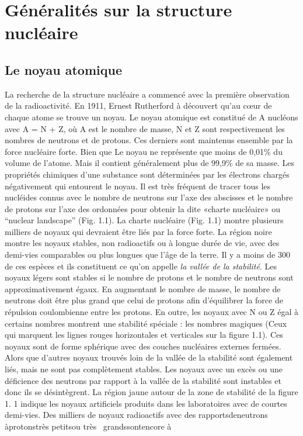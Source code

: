 \chapter{Généralités sur la structure nucléaire}

\section{Le noyau atomique}

 La recherche de la structure nucléaire a commencé avec la première observation de la radioactivité. En
1911, Ernest Rutherford à découvert qu'au cœur de chaque atome se trouve un noyau.
 Le noyau atomique est constitué de A nucléons avec A = N + Z, où A est le nombre de masse, N et Z sont
respectivement les nombres de neutrons et de protons. Ces derniers sont maintenus ensemble par la force nucléaire
forte. Bien que Le noyau ne représente que moins de 0,01\% du volume de l'atome. Mais il contient généralement plus de
99,9\% de sa masse. Les propriétés chimiques d'une substance sont déterminées par les électrons chargés négativement
qui entourent le noyau.
 Il est très fréquent de tracer tous les nucléides connus avec le nombre de neutrons sur l'axe des
abscisses et le nombre de protons sur l'axe des ordonnées pour obtenir la dite «charte nucléaire» ou “nuclear
landscape” (Fig. 1.1).
 La charte nucléaire (Fig. 1.1) montre plusieurs milliers de noyaux qui devraient être liés par la
force forte. La région noire montre les noyaux stables, non radioactifs ou à longue durée de vie, avec des demi-vies
comparables ou plus longues que l'âge de la terre. Il y a moins de 300 de ces espèces et ils constituent ce qu'on
appelle {\textquotedbl}\textit{la vallée de la stabilité}{\textquotedbl}. Les noyaux légers sont stables si le nombre
de protons et le nombre de neutrons sont approximativement égaux. En augmentant le nombre de masse, le nombre de
neutrons doit être plus grand que celui de protons afin d'équilibrer la force de répulsion coulombienne entre les
protons. En outre, les noyaux avec N ou Z égal à certains nombres montrent une stabilité spéciale : les nombres
magiques (Ceux qui marquent les lignes rouges horizontales et verticales sur la figure 1.1). Ces noyaux sont de forme
sphérique avec des couches nucléaires externes fermées. Alors que d'autres noyaux trouvés loin de la vallée de la
stabilité sont également liés, mais ne sont pas complètement stables. Les noyaux avec un excès ou une déficience des
neutrons par rapport à la vallée de la stabilité sont instables et donc ils se désintègrent. La région jaune autour de
la zone de stabilité de la figure 1. 1 indique les noyaux artificiels produits dans les laboratoires avec de courtes
demi-vies. Des milliers de noyaux radioactifs avec des rapportsdeneutrons àprotonstrès petitsou très
\ grandssontencore à
 
